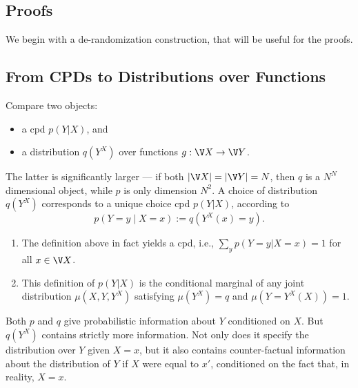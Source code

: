 \clearpage
\begin{subappendices}


\section{Proofs}
    \label{appendix:proofs}
    

We begin with a de-randomization construction, that will be useful for the proofs. 

\subsection{From CPDs to Distributions over Functions}
    \label{sec:cpd-derandomize}
Compare two objects:
\begin{itemize}[nosep]
    \item a cpd $p(Y|X)$, and
    \item a distribution $q(Y^X)$ over functions $g : \V X \to \V Y$. 
\end{itemize}

The latter is significantly larger --- if both $|\V X| = | \V Y | = N$, then
$q$ is a $N^N$ dimensional object, while $p$ is only dimension $N^2$. 
A choice of distribution $q(Y^X)$ corresponds to a unique choice cpd $p(Y|X)$, according to 
\[
    p(Y{=}y\mid X{=}x) :=
        q(Y^X(x) = y)
        .
\]
\begin{claim}
\begin{enumerate}[nosep]
\item The definition above in fact yields a cpd, i.e., $\sum_y p(Y{=}y|X{=}x) = 1$
for all $x \in \V X$. 
\item 
This definition of $p(Y|X)$ is the conditional marginal of any
    joint distribution  $\mu(X,Y,Y^X)$ satisfying $\mu(Y^X) = q$ and
    $\mu(Y = Y^X(X)) = 1$. 
\end{enumerate}
\end{claim}
Both $p$ and $q$ give probabilistic information about $Y$ conditioned
on $X$. But $q(Y^X)$ contains strictly more information.
Not only does it specify the distribution over $Y$ given $X{=}x$,
but it also contains counter-factual information about the distribution of $Y$
    if $X$ were equal to $x'$, conditioned on the fact that, in reality, $X{=}x$.


\end{subappendices}
